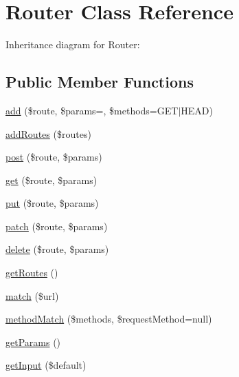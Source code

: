 \hypertarget{class_zest_1_1_router_1_1_router}{}\section{Router Class Reference}
\label{class_zest_1_1_router_1_1_router}


Inheritance diagram for Router\+:
\subsection*{Public Member Functions}
\begin{DoxyCompactItemize}
\item 
\mbox{\hyperlink{class_zest_1_1_router_1_1_router_ac897e899f8138035a0cffd811e66e511}{add}} (\$route, \$params=\textquotesingle{}\textquotesingle{}, \$methods=\textquotesingle{}G\+ET$\vert$H\+E\+AD\textquotesingle{})
\item 
\mbox{\hyperlink{class_zest_1_1_router_1_1_router_aaa3340c31a0589e86c4776ac12728380}{add\+Routes}} (\$routes)
\item 
\mbox{\hyperlink{class_zest_1_1_router_1_1_router_aa429da1bb99f01f3cb6cb852bd5c6d1b}{post}} (\$route, \$params)
\item 
\mbox{\hyperlink{class_zest_1_1_router_1_1_router_a51dc358f1d8ce5d2e4029c45c2097890}{get}} (\$route, \$params)
\item 
\mbox{\hyperlink{class_zest_1_1_router_1_1_router_adf823f3a16fa82141c7933c7ae927f65}{put}} (\$route, \$params)
\item 
\mbox{\hyperlink{class_zest_1_1_router_1_1_router_a73c86b4094ed082a203f231dccd9bf61}{patch}} (\$route, \$params)
\item 
\mbox{\hyperlink{class_zest_1_1_router_1_1_router_a893e99daba2c70ee898cb9c89a8e5e81}{delete}} (\$route, \$params)
\item 
\mbox{\hyperlink{class_zest_1_1_router_1_1_router_a18da86bf318ebe47e501aaad267d59ed}{get\+Routes}} ()
\item 
\mbox{\hyperlink{class_zest_1_1_router_1_1_router_abd724f6a6c6ad25275026dede10a1495}{match}} (\$url)
\item 
\mbox{\hyperlink{class_zest_1_1_router_1_1_router_a732fd0dc552efc395b1ed94302359743}{method\+Match}} (\$methods, \$request\+Method=null)
\item 
\mbox{\hyperlink{class_zest_1_1_router_1_1_router_ae32cd7c32721b02d676bb63b4b1366db}{get\+Params}} ()
\item 
\mbox{\hyperlink{class_zest_1_1_router_1_1_router_a9ab4dc1db3227cf616f0ab395b0457c2}{get\+Input}} (\$default)

\end{DoxyCompactItemize}
